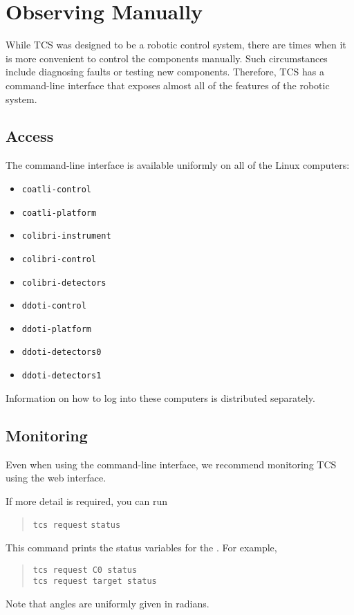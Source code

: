 \chapter{Observing Manually}
\label{chapter:observing-manually}

While TCS was designed to be a robotic control system, there are times when it is more convenient to control the components manually. Such circumstances include diagnosing faults or testing new components. Therefore, TCS has a command-line interface that exposes almost all of the features of the robotic system.

\section{Access}

The command-line interface is available uniformly on all of the Linux computers:
\begin{itemize}
\ifcoatli
\item \verb|coatli-control|
\item \verb|coatli-platform|
\item \verb|colibri-instrument|
\fi
\ifcolibri
\item \verb|colibri-control|
\item \verb|colibri-detectors|
\fi
\ifddoti
\item \verb|ddoti-control|
\item \verb|ddoti-platform|
\item \verb|ddoti-detectors0|
\item \verb|ddoti-detectors1|
\fi
\end{itemize}
Information on how to log into these computers is distributed separately.

\section{Monitoring}

Even when using the command-line interface, we recommend monitoring TCS using the web interface. 

If more detail is required, you can run
\begin{quote}
\verb|tcs request|  \verb|status|
\end{quote}
This command prints the status variables for the . For example,
\begin{quote}
\verb|tcs request C0 status|\\
\verb|tcs request target status|
\end{quote}
Note that angles are uniformly given in radians.

